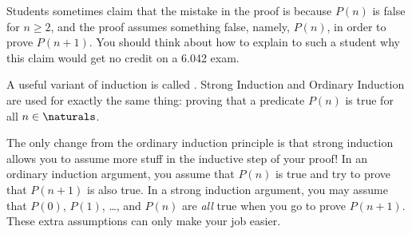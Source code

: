 
Students sometimes claim that the mistake in the proof is because $P(n)$
is false for $n \geq 2$, and the proof assumes something false, namely,
$P(n)$, in order to prove $P(n+1)$.  You should think about how to explain
to such a student why this claim would get no credit on a 6.042 exam.

\begin{problems}
\classproblems
{}
\homeworkproblems
{}
\end{problems}



A useful variant of induction is called .  Strong
Induction and Ordinary Induction are used for exactly the same thing:
proving that a predicate $P(n)$ is true for all $n \in \naturals$.


The only change from the ordinary induction principle is that strong
induction allows you to assume more stuff in the inductive step of your
proof!  In an ordinary induction argument, you assume that $P(n)$ is true
and try to prove that $P(n+1)$ is also true.  In a strong induction
argument, you may assume that $P(0)$, $P(1)$, \dots, and $P(n)$ are
\emph{all} true when you go to prove $P(n+1)$.  These extra assumptions
can only make your job easier.

